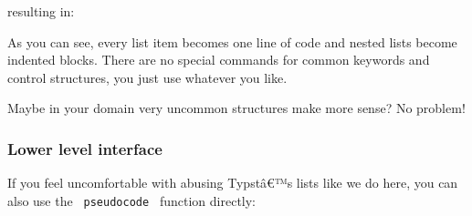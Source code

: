 \begin{Shaded}
\begin{Highlighting}[]
\NormalTok{\#pseudocode{-}list[}
\NormalTok{]}
\end{Highlighting}
\end{Shaded}

resulting in:

\pandocbounded{}

As you can see, every list item becomes one line of code and nested
lists become indented blocks. There are no special commands for common
keywords and control structures, you just use whatever you like.

Maybe in your domain very uncommon structures make more sense? No
problem!

\begin{Shaded}
\begin{Highlighting}[]
\NormalTok{\#pseudocode{-}list[}
\NormalTok{]}
\end{Highlighting}
\end{Shaded}

\pandocbounded{}

\subsubsection{Lower level interface}\label{lower-level-interface}

If you feel uncomfortable with abusing Typstâ€™s lists like we do here,
you can also use the \texttt{\ pseudocode\ } function directly:

\begin{Shaded}
\begin{Highlighting}[]
\NormalTok{  [do something],}
\NormalTok{    ),}
\NormalTok{    [*else*],}
\NormalTok{      [go home],}
\NormalTok{    ),}
\NormalTok{    [*end*],}
\NormalTok{  ),}
\NormalTok{  [*end*],}
\NormalTok{)}
\end{Highlighting}
\end{Shaded}

